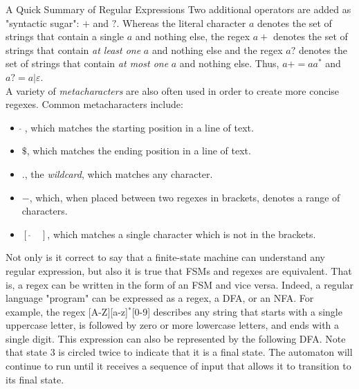 \begin{bluebox}{A Quick Summary of Regular Expressions}
    Two additional operators are added as "syntactic sugar": $+$ and $?$. Whereas the literal character $a$ denotes the set of strings that contain a single $a$ and nothing else, the regex $a+$ denotes the set of strings that contain \textit{at least one} $a$ and nothing else and the regex $a?$ denotes the set of strings that contain \textit{at most one} $a$ and nothing else. Thus, $a+=aa^*$ and $a?=a|\varepsilon$. \\
        
    A variety of \textit{metacharacters} are also often used in order to create more concise regexes. Common metacharacters include:
        
    \begin{itemize}
        \item $\hat{}\;$, which matches the starting position in a line of text.
        \item $\$$, which matches the ending position in a line of text.
        \item $.$, the \textit{wildcard}, which matches any character.
        \item $-$, which, when placed between two regexes in brackets, denotes a range of characters.
        \item $[\;\hat{}\quad]$, which matches a single character which is not in the brackets.
    \end{itemize}

\end{bluebox}

Not only is it correct to say that a finite-state machine can understand any regular expression, but also it is true that FSMs and regexes are equivalent. That is, a regex can be written in the form of an FSM and vice versa. Indeed, a regular language "program" can be expressed as a regex, a DFA, or an NFA. For example, the regex [A-Z][a-z]$^*$[0-9] describes any string that starts with a single uppercase letter, is followed by zero or more lowercase letters, and ends with a single digit. This expression can also be represented by the following DFA. Note that state $3$ is circled twice to indicate that it is a final state. The automaton will continue to run until it receives a sequence of input that allows it to transition to its final state.\\

